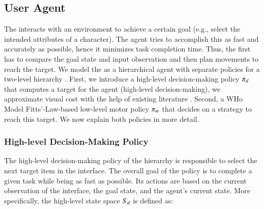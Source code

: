 \subsection{User Agent}
\label{sec:user_agent}


The \useragent interacts with an environment to achieve a certain goal (e.g., select the intended attributes of a character). The agent tries to accomplish this as fast and accurately as possible, hence it minimizes task completion time. Thus, the \useragent first has to compare the goal state and input observation and then plan movements to reach the target. We model the \useragent as a hierarchical agent with separate policies for a two-level hierarchy \cite{Langerak:2021:Generalizing}. First, we introduce a high-level decision-making policy $\pi_d$ that computes a target for the agent (high-level decision-making), we approximate visual cost with the help of existing literature \cite{10.1145/1240624.1240723}. Second, a WHo Model Fitts'-Law-based low-level motor policy $\pi_m$ that decides on a strategy to reach this target. We now explain both policies in more detail.

\subsubsection{High-level Decision-Making Policy}
The high-level decision-making policy of the hierarchy is responsible to select the next target item in the interface. The overall goal of the policy is to complete a given task while being as fast as possible. Its actions are based on the current observation of the interface, the goal state, and the agent's current state. More specifically, the high-level state space $S_d$ is defined as:

